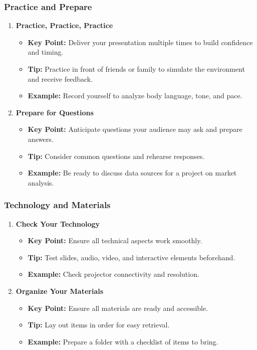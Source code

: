 \documentclass[aspectratio=169]{beamer}
\begin{document}
\begin{frame}[fragile]
    \frametitle{Practice and Prepare}
    \begin{enumerate}
        \item \textbf{Practice, Practice, Practice}
        \begin{itemize}
            \item \textbf{Key Point:} Deliver your presentation multiple times to build confidence and timing.
            \item \textbf{Tip:} Practice in front of friends or family to simulate the environment and receive feedback.
            \item \textbf{Example:} Record yourself to analyze body language, tone, and pace.
        \end{itemize}

        \item \textbf{Prepare for Questions}
        \begin{itemize}
            \item \textbf{Key Point:} Anticipate questions your audience may ask and prepare answers.
            \item \textbf{Tip:} Consider common questions and rehearse responses.
            \item \textbf{Example:} Be ready to discuss data sources for a project on market analysis.
        \end{itemize}
    \end{enumerate}
\end{frame}

\begin{frame}[fragile]
    \frametitle{Technology and Materials}
    \begin{enumerate}
        \item \textbf{Check Your Technology}
        \begin{itemize}
            \item \textbf{Key Point:} Ensure all technical aspects work smoothly.
            \item \textbf{Tip:} Test slides, audio, video, and interactive elements beforehand.
            \item \textbf{Example:} Check projector connectivity and resolution.
        \end{itemize}

        \item \textbf{Organize Your Materials}
        \begin{itemize}
            \item \textbf{Key Point:} Ensure all materials are ready and accessible.
            \item \textbf{Tip:} Lay out items in order for easy retrieval.
            \item \textbf{Example:} Prepare a folder with a checklist of items to bring.
        \end{itemize}
    \end{enumerate}
\end{frame}
\end{document}
